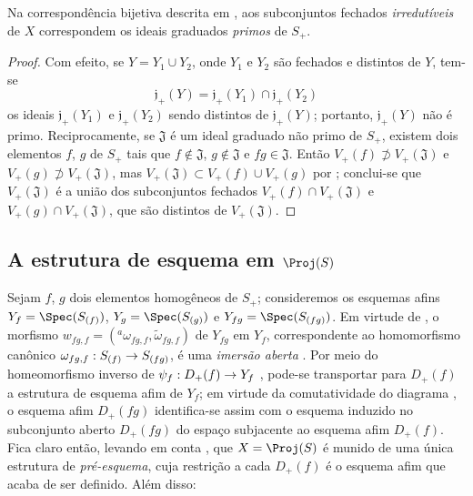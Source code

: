 \documentclass[oneside,10pt]{amsart}
\makeatletter
\newcommand{\ega@arrow}[2]{\mathchoice{#1}{#2}{#2}{#2}}
\renewcommand{\to}{\ega@arrow{\longrightarrow}{\rightarrow}}
\let\EGAOriginalLabel\label
\renewcommand{\label}[1]{\phantomsection\EGAOriginalLabel{#1}}
\makeatother
\begin{document}
\begin{corollary}[2.3.17]
\label{II.2.3.17}
Na correspondência bijetiva descrita em , aos subconjuntos fechados \emph{irredutíveis} de $X$ correspondem os ideais graduados \emph{primos} de $S_+$.
\end{corollary}

\begin{proof}
Com efeito, se $Y=Y_1\cup Y_2$, onde $Y_1$ e $Y_2$ são fechados e distintos de $Y$, tem-se
\[
  \mathfrak{j}_+(Y)=\mathfrak{j}_+(Y_1)\cap\mathfrak{j}_+(Y_2)
\]
os ideais $\mathfrak{j}_+(Y_1)$ e $\mathfrak{j}_+(Y_2)$ sendo distintos de $\mathfrak{j}_+(Y)$; portanto, $\mathfrak{j}_+(Y)$ não é primo.
Reciprocamente, se $\mathfrak{J}$ é um ideal graduado não primo de $S_+$, existem dois elementos $f$, $g$ de $S_+$ tais que $f\notin\mathfrak{J}$, $g\notin\mathfrak{J}$ e $fg\in\mathfrak{J}$.
Então $V_+(f)\not\supset V_+(\mathfrak{J})$ e $V_+(g)\not\supset V_+(\mathfrak{J})$, mas $V_+(\mathfrak{J})\subset V_+(f)\cup V_+(g)$ por ; conclui-se que $V_+(\mathfrak{J})$ é a união dos subconjuntos fechados $V_+(f)\cap V_+(\mathfrak{J})$ e $V_+(g)\cap V_+(\mathfrak{J})$, que são distintos de $V_+(\mathfrak{J})$.
\end{proof}

\subsection{A estrutura de esquema em $\Proj(S)$}
\label{subsection:II.2.4}

\begin{env}[2.4.1]
\label{II.2.4.1}
Sejam $f$, $g$ dois elementos homogêneos de $S_+$; consideremos os esquemas afins $Y_f=\Spec(S_{(f)})$, $Y_g=\Spec(S_{(g)})$ e $Y_{fg}=\Spec(S_{(fg)})$.
Em virtude de , o morfismo $w_{fg,f}=({}^a\!\omega_{fg,f},\widetilde{\omega}_{fg,f})$ de $Y_{fg}$ em $Y_f$, correspondente ao homomorfismo canônico $\omega_{fg,f}:S_{(f)}\to S_{(fg)}$, é uma \emph{imersão aberta} .
Por meio do homeomorfismo inverso de $\psi_f:D_+(f)\to Y_f$ , pode-se transportar para $D_+(f)$ a estrutura de esquema afim de $Y_f$; em virtude da comutatividade do diagrama , o esquema afim $D_+(fg)$ identifica-se assim com o esquema induzido no subconjunto aberto $D_+(fg)$ do espaço subjacente ao esquema afim $D_+(f)$.
Fica claro então, levando em conta , que $X=\Proj(S)$ é munido de uma única estrutura de \emph{pré-esquema}, cuja restrição a cada $D_+(f)$ é o esquema afim que acaba de ser definido.
Além disso:
\end{env}
\end{document}
